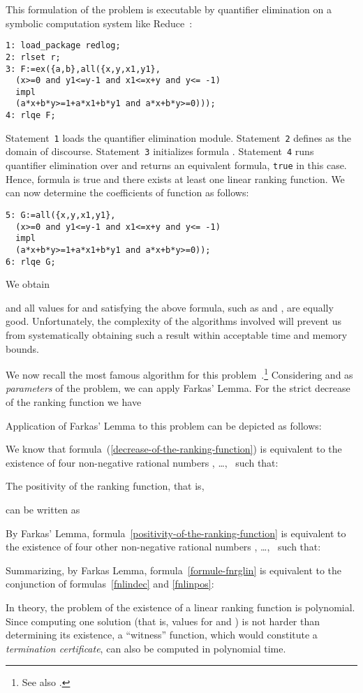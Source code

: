\documentclass{acm_proc_article-sp}
\begin{document}
This formulation of the problem is executable by quantifier
elimination on a symbolic computation system like
Reduce~\cite{Hearn05}:
\begin{verbatim}
1: load_package redlog;
2: rlset r;
3: F:=ex({a,b},all({x,y,x1,y1},
  (x>=0 and y1<=y-1 and x1<=x+y and y<= -1)
  impl
  (a*x+b*y>=1+a*x1+b*y1 and a*x+b*y>=0)));
4: rlqe F;
\end{verbatim}
Statement~\texttt{1} loads the quantifier elimination module.
Statement~\texttt{2} defines  as the domain of discourse.
Statement~\texttt{3} initializes formula .
Statement~\texttt{4} runs quantifier elimination over  and returns
an equivalent formula, \texttt{true} in this case.
Hence, formula  is true and there exists at least one linear
ranking function.
We can now determine the coefficients of function  as follows:
\begin{verbatim}
5: G:=all({x,y,x1,y1},
  (x>=0 and y1<=y-1 and x1<=x+y and y<= -1)
  impl
  (a*x+b*y>=1+a*x1+b*y1 and a*x+b*y>=0));
6: rlqe G;
\end{verbatim}
We obtain

and all values for  and  satisfying the above formula,
such as  and , are equally good.
Unfortunately, the complexity of the algorithms involved
will prevent us from systematically obtaining such a result
within acceptable time and memory bounds.

We now recall the most famous algorithm for this
problem~\cite{PodelskiR04}.\footnote{See also \cite{BagnaraMPZ12IC}.}
Considering  and  as \emph{parameters}
of the problem, we can apply Farkas' Lemma.
For the strict decrease of the ranking function we have

Application of Farkas' Lemma to this problem can be depicted
as follows:

We know that formula~(\ref{decrease-of-the-ranking-function})
is equivalent to the existence of
four non-negative rational numbers
, \dots,~ such that:


The positivity of the ranking function, that is,

can be written as

By Farkas' Lemma, formula~\eqref{positivity-of-the-ranking-function}
is equivalent to the existence of four other non-negative rational numbers
, \dots,~ such that:


Summarizing, by Farkas Lemma,
formula~\eqref{formule-fnrglin} is equivalent to the conjunction
of formulas~\eqref{fnlindec} and \eqref{fnlinpos}:


In theory, the problem of the existence of a linear ranking function
is polynomial. Since computing one solution (that is, values for
 and ) is not harder than determining its existence,
a ``witness'' function, which would constitute a
\emph{termination certificate}, can also be computed in polynomial time.
\end{document}
